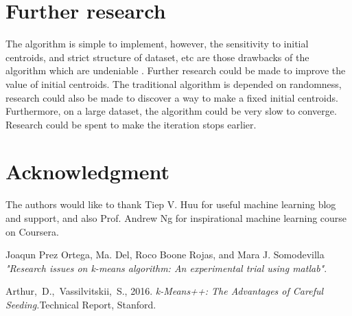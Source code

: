 \documentclass[conference]{IEEEtran}
\begin{document}
\section{Further research}
\indent
	The algorithm is simple to implement, however, the sensitivity to initial centroids, and strict structure of dataset, etc are those drawbacks of the algorithm which are undeniable . Further research could be made to improve the value of initial centroids. The traditional algorithm is depended on randomness, research could also be made to discover a way to make a fixed initial centroids. Furthermore, on a large dataset, the algorithm could be very slow to converge. Research could be spent to make the iteration stops earlier.
\section*{Acknowledgment}

The authors would like to thank Tiep V. Huu for useful machine learning blog and support, and also Prof. Andrew Ng for inspirational machine learning course on Coursera.

\begin{thebibliography}{2}

Joaqun Prez Ortega, Ma. Del, Roco Boone Rojas, and Mara J.
Somodevilla \emph{"Research issues on k-means algorithm: An experimental trial using matlab"}.

Arthur,~D.,~Vassilvitskii,~S., 2016. \emph{k-Means++: The Advantages of Careful Seeding.}Technical Report, Stanford.
\end{thebibliography}
\end{document}

